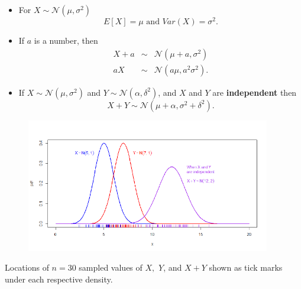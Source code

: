 \documentclass[notes=show,smaller,handout]{beamer}\usepackage[]{graphicx}\usepackage[]{color}
\newcommand{\N}{\mathcal{N}}
\newenvironment{stepitemize}{\begin{itemize}[<+->]}{\end{itemize} }
\begin{document}
\begin{frame}{\secname}


\begin{stepitemize}
\item For $X\sim \N\left( \mu ,\sigma ^{2}\right) $
\begin{equation*}
E\left[ X\right] =\mu \text{ and }Var\left( X\right) =\sigma ^{2}.
\end{equation*}

\item If $a$ is a number, then
\begin{eqnarray*}
X+a &\sim &\N\left( \mu +a,\sigma ^{2}\right) \\
aX &\sim &\N\left( a\mu ,a^{2}\sigma ^{2}\right).
\end{eqnarray*}

\item If $X\sim \N\left( \mu ,\sigma ^{2}\right) $ and $Y\sim \N\left( \alpha
,\delta ^{2}\right) $, and $X$ and $Y$ are \textbf{independent} then%
\begin{equation*}
X+Y\sim \N\left( \mu +\alpha ,\sigma ^{2}+\delta ^{2}\right).
\end{equation*}

\end{stepitemize}

\end{frame}%

\begin{frame}{\secname}



\begin{figure}[ptb]\centering
\includegraphics[width=0.95\textwidth,height=0.7\textheight]{img/sum_of_two_independent_normals_with_rug__1.pdf}%
\end{figure}


Locations of $n=30$ sampled values of $X,$ $Y$, and $X+Y$ shown as tick marks under each respective density.

\end{frame}%
\end{document}
